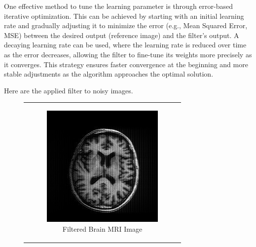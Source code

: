 \documentclass[hidelinks,12pt]{article}
\begin{document}
	One effective method to tune the learning parameter is through error-based iterative optimization. This can be achieved by starting with an initial learning rate and gradually adjusting it to minimize the error (e.g., Mean Squared Error, MSE) between the desired output (reference image) and the filter’s output. A decaying learning rate can be used, where the learning rate is reduced over time as the error decreases, allowing the filter to fine-tune its weights more precisely as it converges. This strategy ensures faster convergence at the beginning and more stable adjustments as the algorithm approaches the optimal solution.
	
	Here are the applied filter to noisy images.
	
	
	\begin{figure}[!h]
		\centering
		\begin{tabular}{c}
			\begin{subfigure}[h]{0.4\textwidth}
				\centering
				\includegraphics[width=\textwidth]{figures/adaptive/brain.jpg}
				\caption{Filtered Brain MRI Image}
			\end{subfigure}
			\hfill
			\begin{subfigure}[h]{0.4\textwidth}
				\centering

\end{subfigure}
\end{tabular}
\end{figure}
\end{document}
